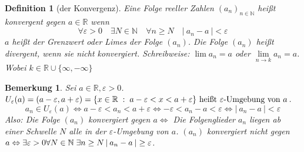 \documentclass[a4paper,titlepage,oneside]{article}
\def\N{\ensuremath{\mathbb{N}} }
\def\R{\ensuremath{\mathbb{R}} }
\renewcommand{\epsilon}{\ensuremath{\varepsilon} }
\def\sp{\hspace{0,1cm}}
\newcommand{\abs}[1]{\ensuremath{\left|\:#1\:\right|}}
\newcommand{\menge}[2]{\ensuremath{\{#1\sp : \sp #2\}}}
\theoremstyle{thmstyle}
\newtheorem{defi}[satz]{Definition}
\newtheorem{bem}[satz]{Bemerkung}
\begin{document}
\begin{defi}[der Konvergenz]
Eine Folge reeller Zahlen \((a_n)_{n\in\N}\) heißt konvergent gegen \( a\in\R\) wenn
\[\forall \epsilon > 0 \quad \exists N \in \N \quad \forall n \ge N \quad \abs{a_n - a} < \epsilon\]
\(a\) heißt der Grenzwert oder Limes der Folge \((a_n)\). Die Folge \((a_n)\) heißt divergent, wenn sie nicht konvergiert. Schreibweise: \(\lim{a_n} = a \) oder \( \lim\limits_{n \to k}{a_n} = a \). Wobei \( k \in \R\cup\{\infty, -\infty\}\)
\end{defi}

\begin{bem}
Sei \(a \in \R, \epsilon > 0\). \(U_\epsilon(a) = (a-\epsilon, a+\epsilon) = \menge{x \in \R}{a - \epsilon < x < a + \epsilon} \text{ heißt } \epsilon\text{-Umgebung von }a\).
\[ a_n \in U_\epsilon(a) \Leftrightarrow a-\epsilon < a_n < a + \epsilon \Leftrightarrow -\epsilon < a_n - a < \epsilon \Leftrightarrow \abs{a_n - a} < \epsilon\]
Also: Die Folge \((a_n)\) konvergiert gegen \(a \Leftrightarrow \) Die Folgenglieder \(a_n\) liegen ab einer Schwelle \(N\) alle in der \(\epsilon\)-Umgebung von \(a\). \((a_n)\) konvergiert nicht gegen \(a \Leftrightarrow \exists \epsilon > 0 \forall N\in\N \sp \exists n \ge N \abs{a_n - a} \ge \epsilon\).
\end{bem}
\end{document}
